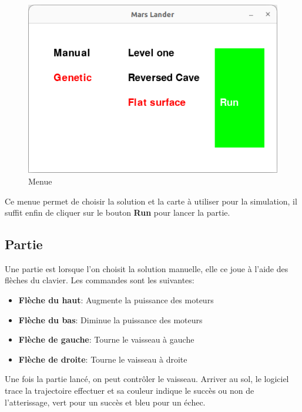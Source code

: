 \documentclass[french,a4paper,10pt,twocolumn]{article}
\begin{document}
\begin{figure}[H]
    \centering
    \includegraphics[scale=0.5]{images/menue.png}
    \caption{Menue}\label{fig:menue}
\end{figure}

Ce menue permet de choisir la solution et la carte à utiliser pour la simulation, il suffit enfin de cliquer sur le bouton \textbf{Run} pour lancer la partie.

\subsection{Partie}

Une partie est lorsque l'on choisit la solution manuelle, elle ce joue à l'aide des flèches du clavier.
Les commandes sont les suivantes:
\begin{itemize}
    \item \textbf{Flèche du haut}: Augmente la puissance des moteurs
    \item \textbf{Flèche du bas}: Diminue la puissance des moteurs
    \item \textbf{Flèche de gauche}: Tourne le vaisseau à gauche
    \item \textbf{Flèche de droite}: Tourne le vaisseau à droite
\end{itemize}

Une fois la partie lancé, on peut contrôler le vaisseau. Arriver au sol, le logiciel trace la trajectoire effectuer
et sa couleur indique le succès ou non de l'atterissage, vert pour un succès et bleu pour un échec.
\end{document}
